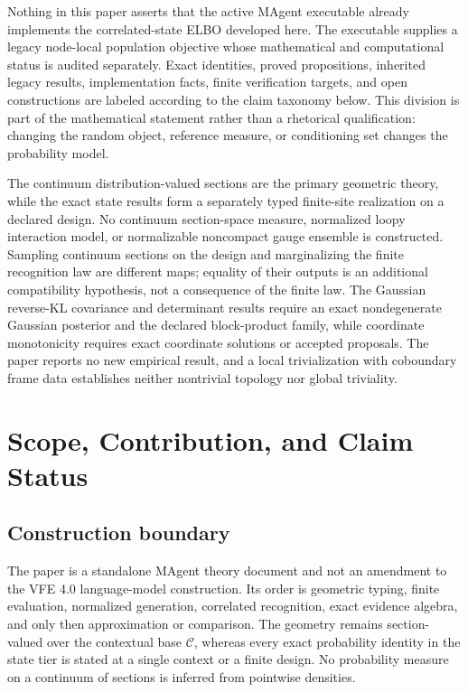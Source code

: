 Nothing in this paper asserts that the active MAgent executable already implements the correlated-state ELBO developed here. The executable supplies a legacy node-local population objective whose mathematical and computational status is audited separately. Exact identities, proved propositions, inherited legacy results, implementation facts, finite verification targets, and open constructions are labeled according to the claim taxonomy below. This division is part of the mathematical statement rather than a rhetorical qualification: changing the random object, reference measure, or conditioning set changes the probability model.

The continuum distribution-valued sections are the primary geometric theory, while the exact state results form a separately typed finite-site realization on a declared design. No continuum section-space measure, normalized loopy interaction model, or normalizable noncompact gauge ensemble is constructed. Sampling continuum sections on the design and marginalizing the finite recognition law are different maps; equality of their outputs is an additional compatibility hypothesis, not a consequence of the finite law. The Gaussian reverse-KL covariance and determinant results require an exact nondegenerate Gaussian posterior and the declared block-product family, while coordinate monotonicity requires exact coordinate solutions or accepted proposals. The paper reports no new empirical result, and a local trivialization with coboundary frame data establishes neither nontrivial topology nor global triviality.

\chapter{Scope, Contribution, and Claim Status}
\label{ch:scope}

\section{Construction boundary}

The paper is a standalone MAgent theory document and not an amendment to the VFE 4.0 language-model construction. Its order is geometric typing, finite evaluation, normalized generation, correlated recognition, exact evidence algebra, and only then approximation or comparison. The geometry remains section-valued over the contextual base \(\mathcal C\), whereas every exact probability identity in the state tier is stated at a single context or a finite design. No probability measure on a continuum of sections is inferred from pointwise densities.

